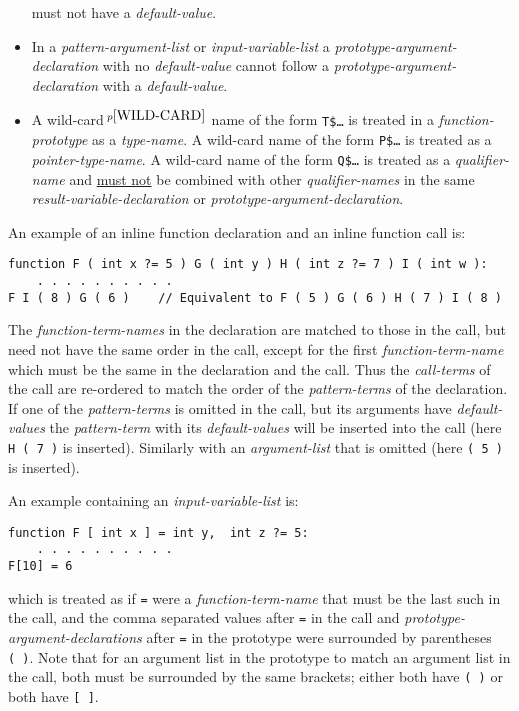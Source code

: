 \documentclass[12pt]{article}
\newcommand{\pagnote}[1]{$\,^{p\pageref{#1}}$}
\newenvironment{indpar}[1][0.3in]%
	{\begin{list}{}%
		     {\setlength{\itemsep}{0in}%
		      \setlength{\topsep}{0in}%
		      \setlength{\parsep}{1ex}%
		      \setlength{\labelwidth}{#1}%
		      \setlength{\leftmargin}{#1}%
		      \addtolength{\leftmargin}{\labelsep}}%
	 \item}%
	{\end{list}}
\begin{document}
\begin{indpar}[0.1in]
\begin{itemize}
must not have a {\em default-value}.
\item
In a {\em pattern-argument-list} or {\em input-variable-list}
a {\em prototype-argument-declaration} with no {\em de\-fault-value} cannot
follow a {\em prototype-argument-declaration} with a {\em default-value}.
\item
A wild-card\pagnote{WILD-CARD} name of the form {\tt T\$\ldots}
is treated in a {\em function-prototype} as a {\em type-name}.
A wild-card name of the form {\tt P\$\ldots} is treated as a
{\em pointer-type-name}.
A wild-card name of the form {\tt Q\$\ldots} is treated as a
{\em qualifier-name} and \underline{must not} be combined with
other {\em qualifier-names} in the same {\em result-variable-declaration}
or {\em prototype-argument-declaration}.

\end{itemize}
\end{indpar}

An example of an inline function declaration and an inline function call is:
\begin{indpar}\begin{verbatim}
function F ( int x ?= 5 ) G ( int y ) H ( int z ?= 7 ) I ( int w ):
    . . . . . . . . . .
F I ( 8 ) G ( 6 )    // Equivalent to F ( 5 ) G ( 6 ) H ( 7 ) I ( 8 )
\end{verbatim}\end{indpar}

The {\em function-term-names} in the declaration are matched to those
in the call, but need not have the same order in the call, except for
the first {\em function-term-name} which must be the same in the
declaration and the call.  Thus the {\em call-terms} of the call
are re-ordered to match the order of the {\em pattern-terms} of the
declaration.  If one of the {\em pattern-terms} is omitted in the
call, but its arguments have {\em default-values}
the {\em pattern-term} with its
{\em default-values} will be inserted into the call
(here {\tt H ( 7 )} is inserted).
Similarly with an {\em argument-list} that is omitted
(here {\tt ( 5 )} is inserted).

An example containing an {\em input-variable-list} is:
\begin{indpar}\begin{verbatim}
function F [ int x ] = int y,  int z ?= 5:
    . . . . . . . . . .
F[10] = 6
\end{verbatim}\end{indpar}
which is treated as if {\tt =} were a {\em function-term-name}
that must be the last such in the call, and the comma separated
values after {\tt =}
in the call and {\em prototype-argument-declarations} after {\tt =}
in the prototype
were surrounded by parentheses {\tt (~)}.  Note that for an argument
list in the prototype to match an argument list in the call, both
must be surrounded by the same brackets; either both have {\tt (~)}
or both have {\tt [~]}.
\end{document}

